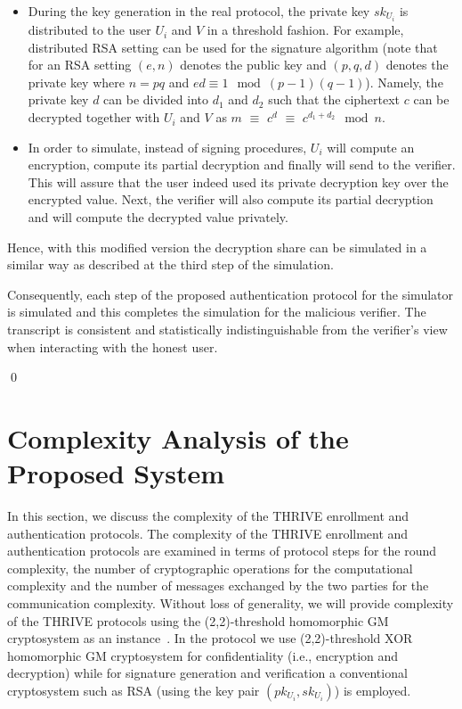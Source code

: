 \documentclass[journal]{IEEEtran}
\begin{document}
\begin{enumerate}
\begin{itemize}
\item During the key generation in the real protocol, the private key $sk_{U_i}$ is distributed to the user $U_i$ and $V$ in a threshold fashion. For example, distributed RSA setting can be used for the signature algorithm (note that for an RSA setting $(e,n)$ denotes the public key and $(p,q,d)$ denotes the private key where $n = pq$ and $ed \equiv 1 \mod (p-1)(q-1)$). Namely, the private key $d$ can be divided into $d_1$ and $d_2$ such that the ciphertext $c$ can be decrypted together with $U_i$ and $V$ as $m$ $\equiv$ $c^d$ $\equiv$ $c^{d_1+d_2} \mod n$. 

\item In order to simulate, instead of signing procedures, $U_i$ will compute an encryption, compute its partial decryption and finally will send to the verifier. This will assure that the user indeed used its private decryption key over the encrypted value. Next, the verifier will also compute its partial decryption and will compute the decrypted value privately.
\end{itemize}

Hence, with this modified version the decryption share can be simulated in a similar way as described at the third step of the simulation. 

\end{enumerate}

Consequently, each step of the proposed authentication protocol for the simulator is simulated and this completes the simulation for the malicious verifier. The transcript is consistent and statistically indistinguishable from the verifier's view when interacting with the honest user. 

\qed

\section{Complexity Analysis of the Proposed System}

In this section, we discuss the complexity of the THRIVE enrollment and authentication protocols. The complexity of the THRIVE enrollment and authentication protocols are examined in terms of protocol steps for the round complexity, the number of cryptographic operations for the computational complexity and the number of messages exchanged by the two parties for the communication complexity. Without loss of generality, we will provide complexity of the THRIVE protocols using the (2,2)-threshold homomorphic GM cryptosystem as an instance~\cite{GM84}. In the protocol we use (2,2)-threshold XOR homomorphic GM cryptosystem for confidentiality (i.e., encryption and decryption) while for signature generation and verification a conventional cryptosystem such as RSA (using the key pair $(pk_{U_i},sk_{U_i})$) is employed.
\end{document}

